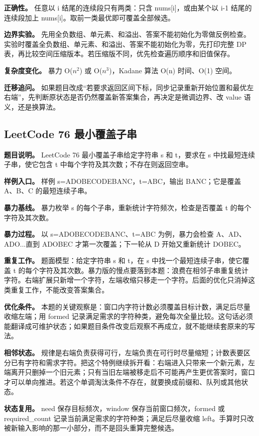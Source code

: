 \textbf{正确性。} 任意以 i 结尾的连续段只有两类：只含 nums[i]，或由某个以 i-1 结尾的连续段加上 nums[i]。取前一类最优即可覆盖全部候选。

\textbf{边界实验。} 先用全负数组、单元素、和溢出、答案不能初始化为零做反例检查。实验时覆盖全负数组、单元素、和溢出、答案不能初始化为零，先打印完整 DP 表，再比较空间压缩版本。若压缩版不同，优先检查遍历顺序和旧值保存。

\textbf{复杂度变化。} 暴力 O(\ensuremath{n^{2}}) 或 O(\ensuremath{n^{3}})，Kadane 算法 O(n) 时间、O(1) 空间。

\textbf{迁移追问。} 如果题目改成“若要求返回区间下标，同步记录重新开始位置和最优左右端”，先判断原状态是否仍然覆盖新答案集合，再决定是微调边界、改 value 语义，还是换算法。

\subsection{LeetCode 76 最小覆盖子串}

\textbf{题目说明。} LeetCode 76 最小覆盖子串给定字符串 s 和 t，要求在 s 中找最短连续子串，使它包含 t 中每个字符及其次数；不存在则返回空串。

\textbf{样例入口。} 样例 s=ADOBECODEBANC，t=ABC，输出 BANC；它是覆盖 A、B、C 的最短连续子串。

\textbf{暴力基线。} 暴力枚举 s 的每个子串，重新统计字符频次，检查是否覆盖 t 的每个字符及其次数。

\textbf{暴力过程。} 以 s=ADOBECODEBANC、t=ABC 为例，暴力会检查 A、AD、ADO...直到 ADOBEC 才第一次覆盖；下一轮从 D 开始又重新统计 DOBEC。

\textbf{重复工作。} 题面模型：给定字符串 s 和 t，在 s 中找一个最短连续子串，使它覆盖 t 的每个字符及其次数。暴力版的慢点要落到本题：浪费在相邻子串重复统计字符。右端扩展只新增一个字符，左端收缩只移走一个字符。后面的优化只消掉这类重复工作，不能改变答案集合。

\textbf{优化条件。} 本题的关键观察是：窗口内字符计数必须覆盖目标计数，满足后尽量收缩左端；用 formed 记录满足需求的字符种类，避免每次全量比较。这句话必须能翻译成可维护状态；如果题目条件改变后观察不再成立，就不能继续套原来的写法。

\textbf{相邻状态。} 规律是右端负责获得可行，左端负责在可行时尽量缩短；计数表要区分已有字符和需求字符。把这个特例继续拆开看：右端进入只带来一个新元素，左端离开只删掉一个旧元素；只有当旧左端被移走后不可能再产生更优答案时，窗口才可以单向推进。若这个单调淘汰条件不存在，就要换成前缀和、队列或其他状态。

\textbf{状态复用。} need 保存目标频次，window 保存当前窗口频次，formed 或 required\_count 记录当前满足需求的字符种类；满足后尽量收缩 left。手算时只改被新输入影响的那一小部分，而不是回头重算完整候选。

